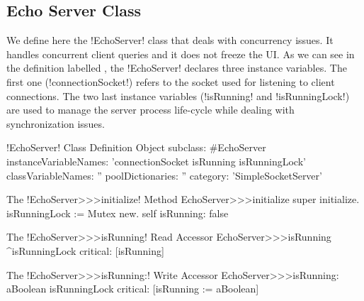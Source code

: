 \documentclass[a4paper,10pt,twoside]{book}
\begin{document}
%

\subsection{Echo Server Class}\label{sec:echoServerClass}
We define here the \ct!EchoServer! class that deals with concurrency issues.
It handles concurrent client queries and it does not freeze the UI.
As we can see in the definition labelled , the \ct!EchoServer! declares three instance variables.
The first one (\ct!connectionSocket!) refers to the socket used for listening to client connections.
The two last instance variables (\ct!isRunning! and \ct!isRunningLock!) are used to manage the server process life-cycle while dealing with synchronization issues.
 
\begin{classdef}[echoServerClassDef]{\ct!EchoServer! Class Definition}
Object subclass: #EchoServer
	instanceVariableNames: 'connectionSocket isRunning isRunningLock'
	classVariableNames: ''
	poolDictionaries: ''
	category: 'SimpleSocketServer'
\end{classdef}

\begin{method}{The \ct!EchoServer>>>initialize! Method}
EchoServer>>>initialize 
	super initialize.
	isRunningLock := Mutex new.
	self isRunning: false
\end{method}

\begin{method}{The \ct!EchoServer>>>isRunning! Read Accessor}
EchoServer>>>isRunning
	^isRunningLock critical: [isRunning]
\end{method}

\begin{method}{The \ct!EchoServer>>>isRunning:! Write Accessor}
EchoServer>>>isRunning: aBoolean
	isRunningLock critical: [isRunning := aBoolean]
\end{method}
\end{document}
